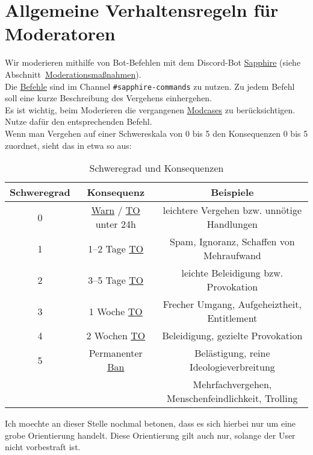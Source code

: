 \documentclass[a4paper,12pt]{article}
\begin{document}
\section{Allgemeine Verhaltensregeln für Moderatoren}
\label{sec:modregeln}
Wir moderieren mithilfe von Bot-Befehlen mit dem Discord-Bot \hyperlink{term:sapphire}{Sapphire} (siehe Abschnitt~\hyperlink{sec:sapphire}{Moderationsmaßnahmen}).\\
Die \hyperlink{term:command}{Befehle} sind im Channel \texttt{\#sapphire-commands} zu nutzen. Zu jedem Befehl soll eine kurze Beschreibung des Vergehens einhergehen.\\
Es ist wichtig, beim Moderieren die vergangenen \hyperlink{term:case}{Modcases} zu berücksichtigen. Nutze dafür den entsprechenden Befehl.\\
Wenn man Vergehen auf einer Schwereskala von 0 bis 5 den Konsequenzen 0 bis 5 zuordnet, sieht das in etwa so aus:
\begin{table}[H]
    \centering
    \caption{Schweregrad und Konsequenzen}
    \label{tab:schweregrad}
    \begin{tabular}{|c|c|c|}
        \hline
        \textbf{Schweregrad} & \textbf{Konsequenz} & \textbf{Beispiele} \\
        \hline
        0 & \hyperlink{term:warn}{Warn} / \hyperlink{term:to}{TO} unter 24h & leichtere Vergehen bzw. unnötige Handlungen\\ \hline
        1 & 1--2 Tage \hyperlink{term:to}{TO} & Spam, Ignoranz, Schaffen von Mehraufwand \\ \hline
        2 & 3--5 Tage \hyperlink{term:to}{TO} & leichte Beleidigung bzw. Provokation \\ \hline
        3 & 1 Woche \hyperlink{term:to}{TO} & Frecher Umgang, Aufgeheiztheit, Entitlement \\ \hline
        4 & 2 Wochen \hyperlink{term:to}{TO} & Beleidigung, gezielte Provokation \\ \hline
        5 & Permanenter \hyperlink{term:ban}{Ban} & Belästigung, reine Ideologieverbreitung \\
          &               & Mehrfachvergehen, Menschenfeindlichkeit, Trolling \\
        \hline
    \end{tabular}
\end{table}
Ich moechte an dieser Stelle nochmal betonen, dass es sich hierbei nur um eine grobe Orientierung handelt. Diese Orientierung
gilt auch nur, solange der User nicht vorbestraft ist.\\ 
\end{document}
